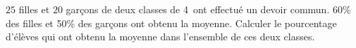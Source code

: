 
$25$ filles et $20$ garçons de deux classes de 4\ieme\ ont effectué un devoir commun.  60\% des filles et 50\% des garçons ont obtenu la moyenne. Calculer le pourcentage d'élèves qui ont obtenu la moyenne dans l'ensemble de ces deux classes.

